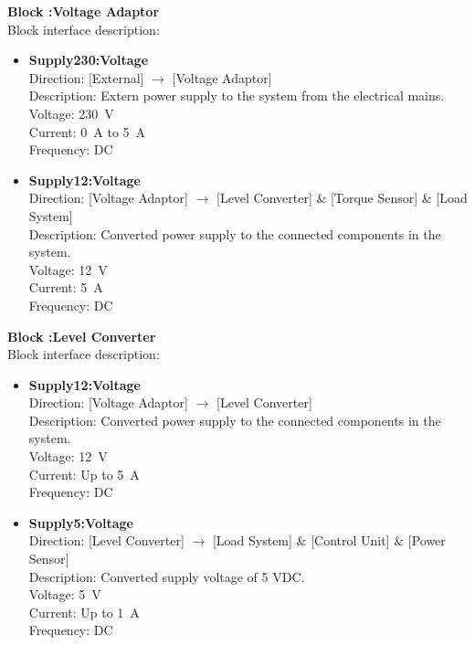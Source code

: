 \textbf{Block :Voltage Adaptor}\\
Block interface description:
\begin{itemize}
	\item \textbf{Supply230:Voltage}\\
	Direction: [External] $\rightarrow$ [Voltage Adaptor]\\
	Description: Extern power supply to the system from the electrical mains.\\
	Voltage: \SI{230}{\volt}\\
	Current: \SI{0}{\ampere} to \SI{5}{\ampere}\\
	Frequency: DC
	\item \textbf{Supply12:Voltage}\\
	Direction: [Voltage Adaptor] $\rightarrow$ [Level Converter] \& [Torque Sensor] \& [Load System]\\
	Description: Converted power supply to the connected components in the system.\\
	Voltage: \SI{12}{\volt}\\
	Current: \SI{5}{\ampere}\\
	Frequency: DC
\end{itemize}
		
\textbf{Block :Level Converter}\\
Block interface description:
\begin{itemize}
	\item \textbf{Supply12:Voltage}\\
	Direction: [Voltage Adaptor] $\rightarrow$ [Level Converter]\\
	Description: Converted power supply to the connected components in the system.\\
	Voltage: \SI{12}{\volt}\\
	Current: Up to \SI{5}{\ampere}\\
	Frequency: DC
	\item \textbf{Supply5:Voltage}\\
	Direction: [Level Converter] $\rightarrow$ [Load System] \& [Control Unit] \& [Power Sensor]\\
	Description: Converted supply voltage of 5 VDC.\\
	Voltage: \SI{5}{\volt}\\
	Current: Up to \SI{1}{\ampere}\\
	Frequency: DC
\end{itemize}

